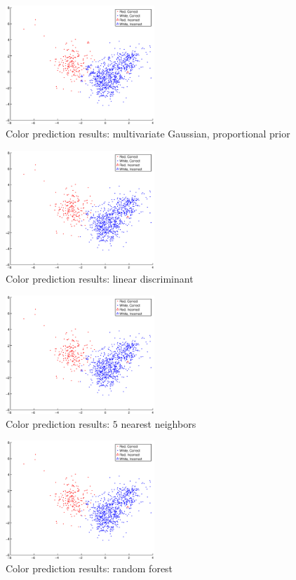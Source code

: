 \documentclass[twoside]{article}
\begin{document}
\begin{multicols}{2}
\begin{figure}[H]
\centering
\includegraphics[width=0.5\textwidth]{colorpca/gauss_prior}
\caption{Color prediction results: multivariate Gaussian, proportional prior}
\end{figure}

\begin{figure}[H]
\centering
\includegraphics[width=0.5\textwidth]{colorpca/linear_discr}
\caption{Color prediction results: linear discriminant}
\end{figure}

\begin{figure}[H]
\centering
\includegraphics[width=0.5\textwidth]{colorpca/knn5}
\caption{Color prediction results: $5$ nearest neighbors}
\end{figure}

\begin{figure}[H]
\centering
\includegraphics[width=0.5\textwidth]{colorpca/random_forest}
\caption{Color prediction results: random forest}
\end{figure}


\end{multicols}
\end{document}
